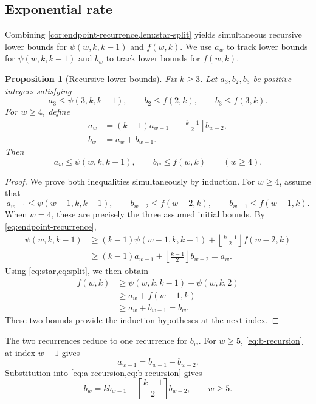 \documentclass[11pt]{article}
\numberwithin{equation}{section}
\newtheorem{proposition}[proposition]{Proposition}
\theoremstyle{definition}
\theoremstyle{remark}
\begin{document}
\subsection{Exponential rate}

Combining \cref{cor:endpoint-recurrence,lem:star-split} yields simultaneous
recursive lower bounds for $\psi(w,k,k-1)$ and $f(w,k)$.
We use $a_w$ to track lower bounds for $\psi(w,k,k-1)$ and $b_w$ to track
lower bounds for $f(w,k)$.

\begin{proposition}[Recursive lower bounds]
\label{prop:recursive-lower}
Fix $k\ge3$. Let $a_3,b_2,b_3$ be positive integers satisfying
\[
 a_3\le\psi(3,k,k-1),
 \qquad
 b_2\le f(2,k),
 \qquad
 b_3\le f(3,k).
\]
For $w\ge4$, define
\begin{align}
 a_w&=(k-1)a_{w-1}
       +\left\lfloor\frac{k-1}{2}\right\rfloor b_{w-2},
 \label{eq:a-recursion}\\
 b_w&=a_w+b_{w-1}.
 \label{eq:b-recursion}
\end{align}
Then
\[
 a_w\le\psi(w,k,k-1),
 \qquad
 b_w\le f(w,k)
 \qquad(w\ge4).
\]
\end{proposition}

\begin{proof}
We prove both inequalities simultaneously by induction. For $w\ge4$, assume
that
\[
 a_{w-1}\le\psi(w-1,k,k-1),
 \qquad
 b_{w-2}\le f(w-2,k),
 \qquad
 b_{w-1}\le f(w-1,k).
\]
When $w=4$, these are precisely the three assumed initial bounds. By
\cref{eq:endpoint-recurrence},
\begin{align*}
 \psi(w,k,k-1)
 &\ge (k-1)\psi(w-1,k,k-1)
      +\left\lfloor\frac{k-1}{2}\right\rfloor f(w-2,k)\\
 &\ge (k-1)a_{w-1}
      +\left\lfloor\frac{k-1}{2}\right\rfloor b_{w-2}
  =a_w.
\end{align*}
Using \cref{eq:star,eq:split}, we then obtain
\begin{align*}
 f(w,k)
 &\ge \psi(w,k,k-1)+\psi(w,k,2)\\
 &\ge a_w+f(w-1,k)\\
 &\ge a_w+b_{w-1}=b_w.
\end{align*}
These two bounds provide the induction hypotheses at the next index.
\end{proof}

The two recurrences reduce to one recurrence for $b_w$. For $w\ge5$,
\cref{eq:b-recursion} at index $w-1$ gives
\[
 a_{w-1}=b_{w-1}-b_{w-2}.
\]
Substitution into \cref{eq:a-recursion,eq:b-recursion} gives
\begin{equation}
 b_w=k b_{w-1}
     -\left\lceil\frac{k-1}{2}\right\rceil b_{w-2},
 \qquad w\ge5.
 \label{eq:reduced-recursion}
\end{equation}
\end{document}
